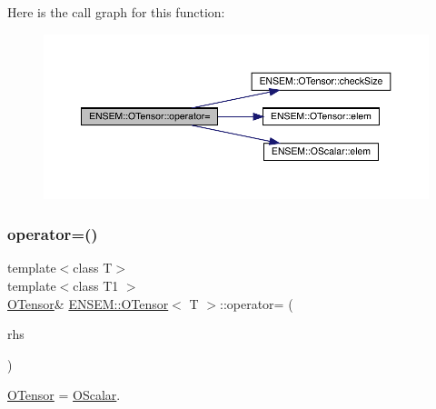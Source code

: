 Here is the call graph for this function\+:
\nopagebreak
\begin{figure}[H]
\begin{center}
\leavevmode
\includegraphics[width=350pt]{da/d8a/classENSEM_1_1OTensor_ae763ca68be1d6b8d5b27b8d544ab5f2d_cgraph}
\end{center}
\end{figure}
\mbox{\label{classENSEM_1_1OTensor_ae763ca68be1d6b8d5b27b8d544ab5f2d}} 
\subsubsection{\texorpdfstring{operator=()}{operator=()}\hspace{0.1cm}{\footnotesize\ttfamily [6/12]}}
{\footnotesize\ttfamily template$<$class T$>$ \\
template$<$class T1 $>$ \\
\mbox{\hyperlink{classENSEM_1_1OTensor}{O\+Tensor}}\& \mbox{\hyperlink{classENSEM_1_1OTensor}{E\+N\+S\+E\+M\+::\+O\+Tensor}}$<$ T $>$\+::operator= (\begin{DoxyParamCaption}\item[{const \mbox{\hyperlink{classENSEM_1_1OScalar}{O\+Scalar}}$<$ T1 $>$ \&}]{rhs }\end{DoxyParamCaption})\hspace{0.3cm}{\ttfamily [inline]}}



\mbox{\hyperlink{classENSEM_1_1OTensor}{O\+Tensor}} = \mbox{\hyperlink{classENSEM_1_1OScalar}{O\+Scalar}}. 

